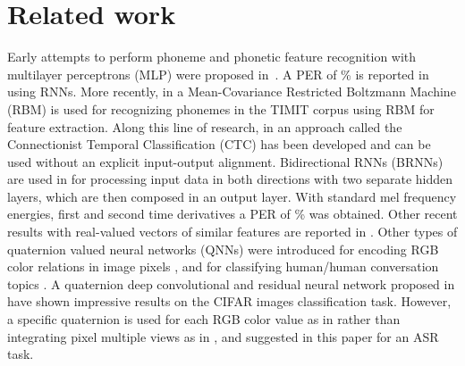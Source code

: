 \documentclass[a4paper]{article}
\begin{document}
\section{Related work}
Early attempts to perform phoneme and phonetic feature recognition with multilayer perceptrons (MLP) were proposed in~\cite{bourlard1996mew,robinson1994application,bengio1992global}. A PER of \% is reported in~\cite{robinson1994application} using RNNs. More recently, in \cite{dahl2010phone} a Mean-Covariance Restricted Boltzmann Machine (RBM) is used for recognizing phonemes in the TIMIT corpus using RBM for feature extraction. Along this line of research, in \cite{graves2006connectionist} an approach called the Connectionist Temporal Classification (CTC) has been developed and can be used without an explicit input-output alignment. 
Bidirectional RNNs (BRNNs) are used in \cite{graves2013speech} for processing input data in both directions with two separate hidden layers, which are then composed in an output layer. With standard mel frequency energies, first and second time derivatives a PER of \% was obtained. Other recent results with real-valued vectors of similar features are reported in \cite{chorowski2014end,mirco2017timit,lu2016segmental,lu2017multi}. Other types of quaternion valued neural networks (QNNs) were introduced for encoding RGB color relations in image pixels \cite{hsiao2014edge,chen2015color,garg2017vector}, and for classifying human/human conversation topics \cite{parcollet2017deep,parcollet2017quaternion,parcollet2016quaternion}. A quaternion deep convolutional and residual neural network proposed in \cite{chase2017quat} have shown impressive results on the CIFAR images classification task. However, a specific quaternion is used for each RGB color value as in \cite{chiheb2017complex} rather than integrating pixel multiple views as in \cite{kusamichi2004new}, and suggested in this paper for an ASR task.
\end{document}
